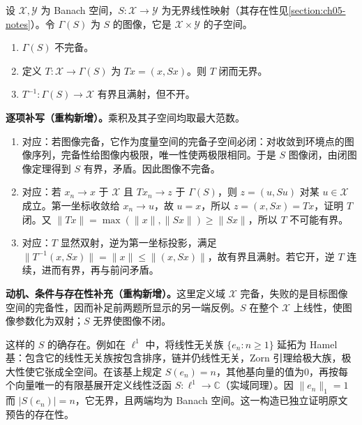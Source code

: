 \documentclass[../../main.tex]{subfiles}
\begin{document}
\begin{exercise}\label{exercise:ch05-unbounded-graph-space}
设 $\mathcal X,\mathcal Y$ 为 Banach 空间，$S:\mathcal X\to\mathcal Y$ 为无界线性映射（其存在性见\cref{section:ch05-notes}）。令 $\Gamma(S)$ 为 $S$ 的图像，它是 $\mathcal X\times\mathcal Y$ 的子空间。
\begin{enumerate}
\item\label{item:ch05-unbounded-graph-incomplete} $\Gamma(S)$ 不完备。
\item\label{item:ch05-graph-parametrization-closed} 定义 $T:\mathcal X\to\Gamma(S)$ 为 $Tx=(x,Sx)$。则 $T$ 闭而无界。
\item\label{item:ch05-graph-projection-not-open} $T^{-1}:\Gamma(S)\to\mathcal X$ 有界且满射，但不开。
\end{enumerate}
\end{exercise}
\begin{solution}
\textbf{逐项补写（重构新增）。}乘积及其子空间均取最大范数。
\begin{enumerate}
\item 对应：若图像完备，它作为度量空间的完备子空间必闭：对收敛到环境点的图像序列，完备性给图像内极限，唯一性使两极限相同。于是 $S$ 图像闭，由闭图像定理得到 $S$ 有界，矛盾。因此图像不完备。
\item 对应：若 $x_n\to x$ 于 $\mathcal X$ 且 $Tx_n\to z$ 于 $\Gamma(S)$，则 $z=(u,Su)$ 对某 $u\in\mathcal X$ 成立。第一坐标收敛给 $x_n\to u$，故 $u=x$，所以 $z=(x,Sx)=Tx$，证明 $T$ 闭。又 $\|Tx\|=\max(\|x\|,\|Sx\|)\ge\|Sx\|$，所以 $T$ 不可能有界。
\item 对应：$T$ 显然双射，逆为第一坐标投影，满足 $\|T^{-1}(x,Sx)\|=\|x\|\le\|(x,Sx)\|$，故有界且满射。若它开，逆 $T$ 连续，进而有界，再与前问矛盾。
\end{enumerate}
\end{solution}
\begin{remark}
\textbf{动机、条件与存在性补充（重构新增）。}这里定义域 $\mathcal X$ 完备，失败的是目标图像空间的完备性，因而补足前两题所显示的另一端反例。$S$ 在整个 $\mathcal X$ 上线性，使图像参数化为双射；$S$ 无界使图像不闭。

这样的 $S$ 的确存在。例如在 $\ell^1$ 中，将线性无关族 $\{e_n:n\ge1\}$ 延拓为 Hamel 基：包含它的线性无关族按包含排序，链并仍线性无关，Zorn 引理给极大族，极大性使它张成全空间。在该基上规定 $S(e_n)=n$，其他基向量的值为0，再按每个向量唯一的有限基展开定义线性泛函 $S:\ell^1\to\mathbb C$（实域同理）。因 $\|e_n\|_1=1$ 而 $|S(e_n)|=n$，它无界，且两端均为 Banach 空间。这一构造已独立证明原文预告的存在性。
\end{remark}
\end{document}
